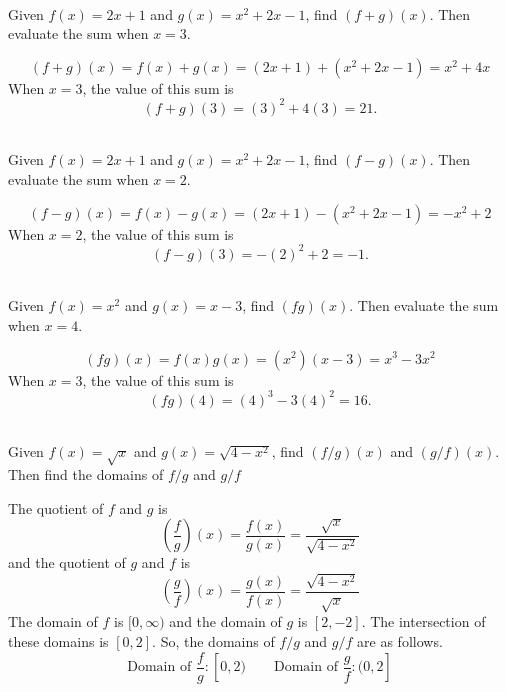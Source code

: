 \begin{example} \cite{ci}~\\
    Given $f(x)=2x+1$ and $g(x)=x^2+2x-1$, find $(f+g)(x)$. Then evaluate the sum when $x=3$.\\
    \begin{solution}
        $$(f+g)(x) = f(x)+g(x) = (2x+1) + (x^2+2x-1) = x^2+4x$$
        When $x = 3$, the value of this sum is
        $$(f+g)(3) = (3)^2+4(3)  =21.$$
    \end{solution}
\end{example}
\begin{example} \cite{ci}~\\
    Given $f(x)=2x+1$ and $g(x)=x^2+2x-1$, find $(f-g)(x)$. Then evaluate the sum when $x=2$.\\
    \begin{solution}
        $$(f-g)(x) = f(x)-g(x) = (2x+1) - (x^2+2x-1) = -x^2+2$$
        When $x = 2$, the value of this sum is
        $$(f-g)(3) = -(2)^2+2  =-1.$$
    \end{solution}
\end{example}
\begin{example} \cite{ci}~\\
    Given $f(x)=x^2$ and $g(x)=x-3$, find $(fg)(x)$. Then evaluate the sum when $x=4$.\\
    \begin{solution}
        $$(fg)(x) = f(x)g(x) = (x^2)(x-3) = x^3-3x^2$$
        When $x = 3$, the value of this sum is
        $$(fg)(4) = (4)^3-3(4)^2  =16.$$
    \end{solution}
\end{example}
\begin{example} \cite{ci}~\\
    Given $f(x)=\sqrt{x}$ and $g(x)=\sqrt{4-x^2}$, find $(f/g)(x)$ and $(g/f)(x)$. Then find the domains of $f/g$ and $g/f$\\
    \begin{solution}
        The quotient of $f$ and $g$ is
        $$\left(\dfrac{f}{g}\right)(x) = \dfrac{f(x)}{g(x)} = \dfrac{\sqrt{x}}{\sqrt{4-x^2}}$$
        and the quotient of $g$ and $f$ is 
        $$\left(\dfrac{g}{f}\right)(x) = \dfrac{g(x)}{f(x)} = \dfrac{\sqrt{4-x^2}}{\sqrt{x}}$$
        The domain of $f$ is $[0,\infty)$ and the domain of $g$ is $[2,-2]$. The intersection of these domains is $[0,2]$. So, the domains of $f/g$ and $g/f$ are as follows.
        $$\text{Domain of }\dfrac{f}{g}: [0,2) 
        \qquad
        \text{Domain of }\dfrac{g}{f}: (0,2] $$
    \end{solution}
\end{example}

